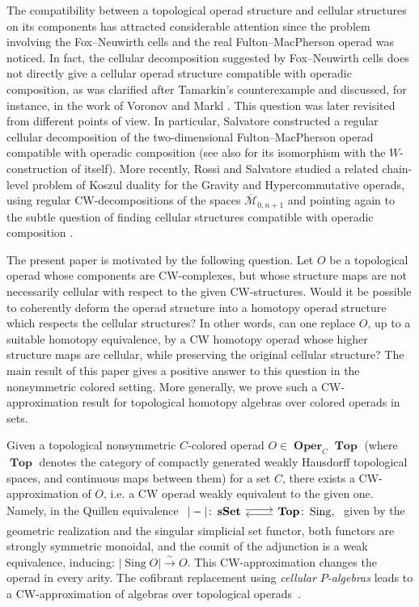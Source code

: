 \documentclass{amsart}
\theoremstyle{definition}
\theoremstyle{remark}
\DeclareMathOperator{\Top}{\mathbf{Top}}
\DeclareMathOperator{\sset}{\mathbf{sSet}}
\DeclareMathOperator{\Oper}{\mathbf{Oper}}
\DeclareMathOperator{\Sing}{Sing}
\begin{document}
	The compatibility between a topological operad structure and cellular structures on its components has attracted considerable attention since the problem involving the Fox--Neuwirth cells and the real Fulton--MacPherson operad was noticed. In fact, the cellular decomposition suggested by Fox--Neuwirth cells does not directly give a cellular operad structure compatible with operadic composition, as was clarified after Tamarkin's counterexample and discussed, for instance, in the work of Voronov and Markl \cite{voro2000HGA,markl2015extension}. This question was later revisited from different points of view. In particular, Salvatore constructed a regular cellular decomposition of the two-dimensional Fulton--MacPherson operad compatible with operadic composition \cite{sa-22} (see also \cite{sa-19} for its isomorphism with the $W$-construction of itself). More recently, Rossi and Salvatore studied a related chain-level problem of Koszul duality for the Gravity and Hypercommutative operads, using regular CW-decompositions of the spaces $\overline{\mathcal M}_{0,n+1}$ and pointing again to the subtle question of finding cellular structures compatible with operadic composition \cite{rossi-sa24}.
	
	The present paper is motivated by the following question. Let $O$ be a topological operad whose components are CW-complexes, but whose structure maps are not necessarily cellular with respect to the given CW-structures. Would it be possible to coherently deform the operad structure into a homotopy operad structure which respects the cellular structures? In other words, can one replace $O$, up to a suitable homotopy equivalence, by a CW homotopy operad whose higher structure maps are cellular, while preserving the original cellular structure? The main result of this paper gives a positive answer to this question in the nonsymmetric colored setting. More generally, we prove such a CW-approximation result for topological homotopy algebras over colored operads in sets.
	
	Given a topological nonsymmetric $C$-colored operad $O\in \Oper_{C}\Top$ (where $\Top$ denotes the category of compactly generated weakly Hausdorff topological spaces, and continuous maps between them) for a set $C$, there exists a CW-approximation of $O$, i.e. a CW operad weakly equivalent to the given one.
	Namely, in the Quillen equivalence
	$	\begin{tikzcd}
		{|-|\colon} \sset \arrow[shift left=.5ex]{r} & \Top \colon \Sing \arrow[shift left=.5ex]{l},
	\end{tikzcd} $
	given by the geometric realization and the singular simplicial set functor, both functors are strongly symmetric monoidal, and the counit of the adjunction is a weak equivalence, inducing:
	$
	|\Sing O|\overset{\sim}{\to} O.
	$
	This CW-approximation changes the operad in every arity. 
	The cofibrant replacement using \textit{cellular $P$-algebras} leads to a CW-approximation of  algebras over topological operads~\cite{be-mo-06}.
	
\end{document}
